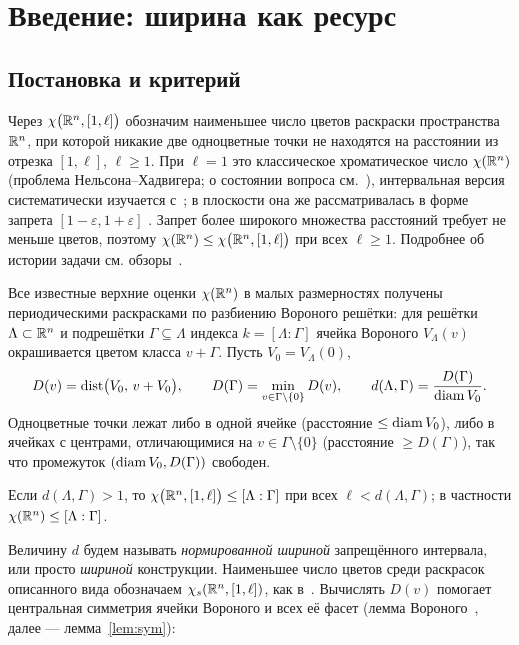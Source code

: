 \section{Введение: ширина как ресурс}\label{sec:intro}

\subsection{Постановка и критерий}

Через $\chi\bigl(\mathbb{R}^n,[1,\ell]\bigr)$ обозначим наименьшее число цветов
раскраски пространства $\mathbb{R}^n$, при которой никакие две одноцветные точки не
находятся на расстоянии из отрезка $[1,\ell]$, $\ell\ge1$. При $\ell=1$ это
классическое хроматическое число $\chi(\mathbb{R}^n)$ (проблема Нельсона--Хадвигера;
о состоянии вопроса см.~\cite{Soifer,deGrey}), интервальная версия
систематически изучается с~\cite{Ivanov2011}; в плоскости она же
рассматривалась в форме запрета $[1-\varepsilon,1+\varepsilon]$
\cite{Exoo2005,ChJW,deGreyParts,Parts2023}. Запрет более широкого множества
расстояний требует не меньше цветов, поэтому
$\chi(\mathbb{R}^n)\le\chi\bigl(\mathbb{R}^n,[1,\ell]\bigr)$ при всех $\ell\ge1$.
Подробнее об истории задачи см. обзоры~\cite{BogolubskyRaigorodskii,Raigorodskii2001,Raigorodskii2013,Raigorodskii2014}.

Все известные верхние оценки $\chi(\mathbb{R}^n)$ в малых размерностях получены
периодическими раскрасками по разбиению Вороного решётки: для решётки
$\Lambda\subset\mathbb{R}^n$ и подрешётки $\Gamma\subseteq\Lambda$ индекса
$k=[\Lambda:\Gamma]$ ячейка Вороного $V_\Lambda(v)$ окрашивается цветом
класса $v+\Gamma$. Пусть $V_0=V_\Lambda(0)$,
\[
D(v)=\operatorname{dist}\bigl(V_0,\,v+V_0\bigr),\qquad
D(\Gamma)=\min_{v\in\Gamma\setminus\{0\}}D(v),\qquad
d(\Lambda,\Gamma)=\frac{D(\Gamma)}{\operatorname{diam} V_0}.
\]
Одноцветные точки лежат либо в одной ячейке (расстояние $\le\operatorname{diam} V_0$),
либо в ячейках с центрами, отличающимися на $v\in\Gamma\setminus\{0\}$
(расстояние $\ge D(\Gamma)$), так что промежуток
$(\operatorname{diam} V_0,D(\Gamma))$ свободен.

\begin{proposition}\label{prop:crit}
Если $d(\Lambda,\Gamma)>1$, то $\chi\bigl(\mathbb{R}^n,[1,\ell]\bigr)\le[\Lambda:\Gamma]$
при всех $\ell<d(\Lambda,\Gamma)$; в частности $\chi(\mathbb{R}^n)\le[\Lambda:\Gamma]$.
\end{proposition}

Величину $d$ будем называть \emph{нормированной шириной} запрещённого
интервала, или просто \emph{шириной} конструкции. Наименьшее число цветов
среди раскрасок описанного вида обозначаем $\chi_s(\mathbb{R}^n,[1,\ell])$, как
в~\cite{Bounds}. Вычислять $D(v)$ помогает
центральная симметрия ячейки Вороного и всех её фасет
(лемма Вороного~\cite{Voronoi}, далее --- лемма~\ref{lem:sym}):

